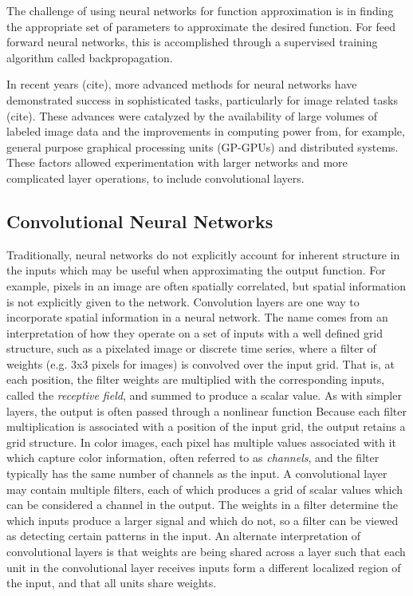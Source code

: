 The challenge of using neural networks for function approximation is in finding the appropriate set of parameters to approximate the desired function. 
For feed forward neural networks, this is accomplished through a supervised training algorithm called backpropagation. 


In recent years (cite), more advanced methods for neural networks have demonstrated success in sophisticated tasks, particularly for image related tasks (cite). 
These advances were catalyzed by the availability of large volumes of labeled image data and the improvements in computing power from, for example, general purpose graphical processing units (GP-GPUs) and distributed systems.
These factors allowed experimentation with larger networks and more complicated layer operations, to include convolutional layers.


\subsection{Convolutional Neural Networks}

Traditionally, neural networks do not explicitly account for inherent structure in the inputs which may be useful when approximating the output function.
For example, pixels in an image are often spatially correlated, but spatial information is not explicitly given to the network.
Convolution layers are one way to incorporate spatial information in a neural network. 
The name comes from an interpretation of how they operate on a set of inputs with a well defined grid structure, such as a pixelated image or discrete time series, where a filter of weights (e.g. 3x3 pixels for images) is convolved over the input grid.
That is, at each position, the filter weights are multiplied with the corresponding inputs, called the \textit{receptive field}, and summed to produce a scalar value.
As with simpler layers, the output is often passed through a nonlinear function
Because each filter multiplication is associated with a position of the input grid, the output retains a grid structure. 
In color images, each pixel has multiple values associated with it which capture color information, often referred to as \textit{channels}, and the filter typically has the same number of channels as the input. 
A convolutional layer may contain multiple filters, each of which produces a grid of scalar values which can be considered a channel in the output.
The weights in a filter determine the which inputs produce a larger signal and which do not, so a filter can be viewed as detecting certain patterns in the input.
An alternate interpretation of convolutional layers is that weights are being shared across a layer such that each unit in the convolutional layer receives inputs form a different localized region of the input, and that all units share weights. 

